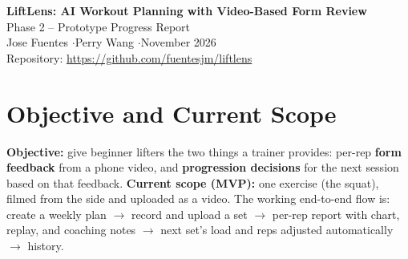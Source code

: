 \documentclass[11pt]{article}
\begin{document}
\begin{center}
  {\Large\bfseries LiftLens: AI Workout Planning with Video-Based Form Review}\\[2pt]
  {\large Phase 2 -- Prototype Progress Report}\\[2pt]
  Jose Fuentes \quad$\cdot$\quad Perry Wang \quad$\cdot$\quad November 2026\\[1pt]
  Repository: \url{https://github.com/fuentesjm/liftlens}
\end{center}
\vspace{-6pt}

\section{Objective and Current Scope}
\textbf{Objective:} give beginner lifters the two things a trainer provides: per-rep \textbf{form feedback} from a phone video, and \textbf{progression decisions} for the next session based on that feedback.
\textbf{Current scope (MVP):} one exercise (the squat), filmed from the side and uploaded as a video. The working end-to-end flow is:
create a weekly plan $\rightarrow$ record and upload a set $\rightarrow$ per-rep report with chart, replay, and coaching notes $\rightarrow$ next set's load and reps adjusted automatically $\rightarrow$ history.

\end{document}

